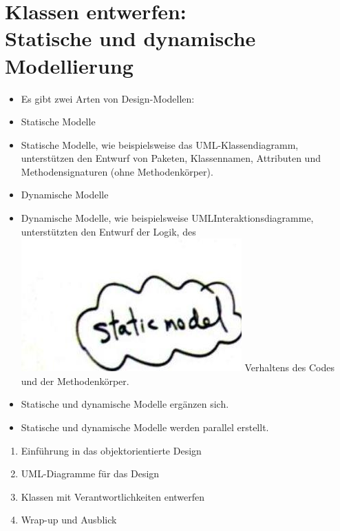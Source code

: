 \documentclass[10pt]{article}
\begin{document}
\section*{Klassen entwerfen: \\
 Statische und dynamische Modellierung}
\begin{itemize}
  \item Es gibt zwei Arten von Design-Modellen:
  \item Statische Modelle
  \item Statische Modelle, wie beispielsweise das UML-Klassendiagramm, unterstützen den Entwurf von Paketen, Klassennamen, Attributen und Methodensignaturen (ohne Methodenkörper).
  \item Dynamische Modelle
  \item Dynamische Modelle, wie beispielsweise UMLInteraktionsdiagramme, unterstützten den Entwurf der Logik, des\\
\includegraphics[width=\linewidth]{images/2025_01_02_787afb9584031d2940deg-09} Verhaltens des Codes und der Methodenkörper.
  \item Statische und dynamische Modelle ergänzen sich.
  \item Statische und dynamische Modelle werden parallel erstellt.
\end{itemize}

\begin{enumerate}
  \item Einführung in das objektorientierte Design
  \item UML-Diagramme für das Design
  \item Klassen mit Verantwortlichkeiten entwerfen
  \item Wrap-up und Ausblick
\end{enumerate}
\end{document}
